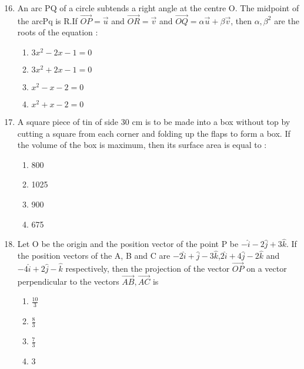 \documentclass[journal]{IEEEtran}
\begin{document}
\begin{enumerate}
\setcounter{enumi}{15}
 
    \item An arc PQ of a circle subtends a right angle at the centre O. The midpoint of the arcPq is R.If $\overrightarrow{OP}=\overrightarrow{u}$ and $\overrightarrow{OR}=\overrightarrow{v}$ and $\overrightarrow{OQ}=\alpha \overrightarrow{u}+\beta \overrightarrow{v}$, then $\alpha, \beta^2$ are the roots of the equation :
        \begin{multicols}{1}
            \begin{enumerate}
                \item $3x^2-2x-1=0$
                \item $3x^2+2x-1=0$
                \item $x^2-x-2=0$
                \item $x^2+x-2=0$
            \end{enumerate}
        \end{multicols}

    \item A square piece of tin of side 30 cm is to be made into a box without top by cutting a square from each corner
and folding up the flaps to form a box. If the volume of the box is maximum, then its surface area  is
equal to :

		\begin{multicols}{4}
			\begin{enumerate}
				\item 800
				\item  1025
				\item  900
				\item  675
			\end{enumerate}
		\end{multicols}

    \item Let O be the origin and the position vector of the point P be $-\hat{i}-2\hat{j}+3\hat{k}.$ If the position vectors of the A, B
and C are $-2\hat{i}+\hat{j}-3\hat{k}$,$2\hat{i}+4\hat{j}-2\hat{k}$ and $-4\hat{i}+2\hat{j}-\hat{k}$ respectively, then the projection of the vector $\overrightarrow{OP}$ on a vector perpendicular to the vectors $\overrightarrow{AB},\overrightarrow{AC}$ is 
        \begin{multicols}{4}
            \begin{enumerate}
              \item $\frac{10}{3}$
              \item $\frac{8}{3}$
              \item $\frac{7}{3}$
              \item $3$
            \end{enumerate}
        \end{multicols}


\end{enumerate}
\end{document}
